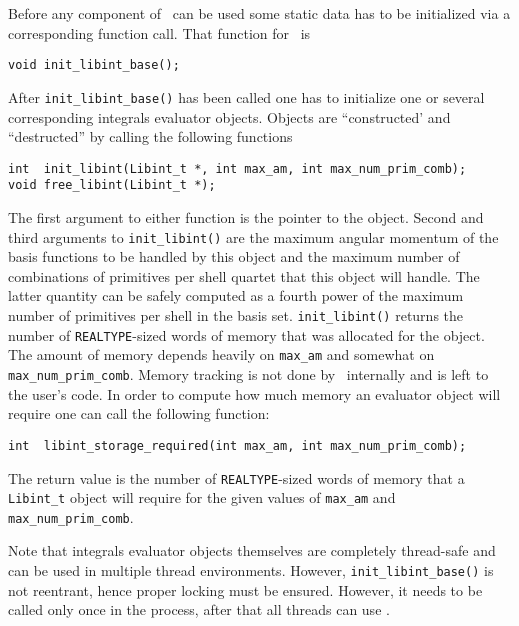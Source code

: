 \documentclass[12pt]{article}
\begin{document}
Before any component of \LIBINT\ can be used some static data has to be initialized
via a corresponding function call. That function for \libint\ is
\begin{verbatim}
void init_libint_base();
\end{verbatim}
After {\tt init\_libint\_base()} has been called one has to initialize one or several corresponding
integrals evaluator objects. Objects are ``constructed' and ``destructed'' by calling
the following functions
\begin{verbatim}
int  init_libint(Libint_t *, int max_am, int max_num_prim_comb);
void free_libint(Libint_t *);
\end{verbatim}
The first argument to either function is the pointer to the object.
Second and third arguments to {\tt init\_libint()} are the maximum angular momentum
of the basis functions to be handled by this object and the maximum number of
combinations of primitives per shell quartet that this object will handle.
The latter quantity can be safely computed as a fourth power of the maximum
number of primitives per shell in the basis set. {\tt init\_libint()} returns the
number of {\tt REALTYPE}-sized words of memory that was allocated for the object.
The amount of memory depends heavily on {\tt max\_am} and somewhat on
{\tt max\_num\_prim\_comb}. Memory tracking is not done by \LIBINT\ internally and
is left to the user's code. In order to compute how much memory an evaluator object
will require one can call the following function:
\begin{verbatim}
int  libint_storage_required(int max_am, int max_num_prim_comb);
\end{verbatim}
The return value is the number of {\tt REALTYPE}-sized words of memory that
a {\tt Libint\_t} object will require for the given values of {\tt max\_am}
and {\tt max\_num\_prim\_comb}.

Note that integrals evaluator objects themselves are completely thread-safe and can be used
in multiple thread environments. However, {\tt init\_libint\_base()} is not reentrant, hence proper
locking must be ensured.
However, it needs to be called only once in the process,
after that all threads can use \libint .
\end{document}
